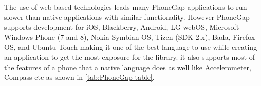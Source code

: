 The use of web-based technologies leads many PhoneGap applications
to run slower than native applications with similar functionality.
However PhoneGap supports development for iOS, Blackberry, Android,
LG webOS, Microsoft Windows Phone (7 and 8), Nokia Symbian OS, Tizen
(SDK 2.x), Bada, Firefox OS, and Ubuntu Touch making it one of the
best language to use while creating an application to get the most
exposure for the library. it also supports most of the features of
a phone that a native language does as well like Accelerometer, Compass
etc as shown in \ref{tab:PhoneGap-table}.



